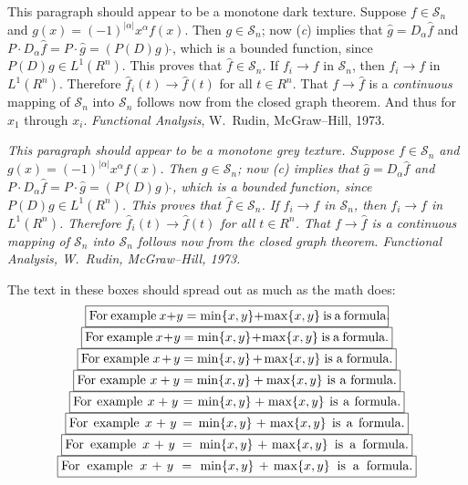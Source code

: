 \documentclass[fleqn]{article}
\newenvironment{boldface}{\bgroup\mathversion{bold}%
  \def\it{\fontseries{b}\fontshape{it}\selectfont}%
  \fontseries{b}\selectfont }{\egroup}
\begin{document}
\begin{boldface}
This paragraph should appear to be a monotone dark texture.  Suppose
\(f \in \mathcal{S}_n\) and \(g(x) = (-1)^{|\alpha|}x^\alpha
f(x)\).  Then \(g \in \mathcal{S}_n\); now (\emph{c}) implies
that \(\hat g = D_\alpha \hat f\) and \(P \cdot D_\alpha\hat
f = P \cdot \hat g = (P(D)g)\hat{}\), which is a bounded function,
since \(P(D)g \in L^1(R^n)\).  This proves that \(\hat f \in
\mathcal S_n\).  If \(f_i \rightarrow f\) in \(\mathcal S_n\),
then \(f_i \rightarrow f\) in \(L^1(R^n)\).  Therefore \(\hat
f_i(t) \rightarrow \hat f(t)\) for all \(t \in R^n\).  That \(f
\rightarrow \hat f\) is a \emph{continuous} mapping of
\(\mathcal S_n\) into \(\mathcal S_n\) follows now from the
closed graph theorem.  And thus for \(x_1\) through \(x_i\).
\emph{Functional Analysis}, W.~Rudin, McGraw--Hill, 1973.
\end{boldface}

{\itshape This paragraph should appear to be a monotone grey texture.
Suppose \(f \in \mathcal{S}_n\) and \(g(x) =
(-1)^{|\alpha|}x^\alpha f(x)\).  Then \(g \in \mathcal{S}_n\);
now (\emph{c}) implies that \(\hat g = D_\alpha \hat f\) and
\(P \cdot D_\alpha\hat f = P \cdot \hat g = (P(D)g)\hat{}\),
which is a bounded function, since \(P(D)g \in L^1(R^n)\).  This
proves that \(\hat f \in \mathcal S_n\).  If \(f_i \rightarrow
f\) in \(\mathcal S_n\), then \(f_i \rightarrow f\) in
\(L^1(R^n)\).  Therefore \(\hat f_i(t) \rightarrow \hat f(t)\)
for all \(t \in R^n\).  That \(f \rightarrow \hat f\) is a
\emph{continuous} mapping of \(\mathcal S_n\) into \(\mathcal
S_n\) follows now from the closed graph theorem.  \emph{Functional
Analysis}, W.~Rudin, McGraw--Hill, 1973.}

The text in these boxes should spread out as much as the math does:
$$\begin{array}{c}
   \framebox[.95\width][s]{For example \(x+y = \min\{x,y\}
      + \max\{x,y\}\) is a formula.} \\
   \framebox[.975\width][s]{For example \(x+y = \min\{x,y\}
      + \max\{x,y\}\) is a formula.} \\
   \framebox[\width][s]{For example \(x+y = \min\{x,y\}
      + \max\{x,y\}\) is a formula.} \\
   \framebox[1.025\width][s]{For example \(x+y = \min\{x,y\}
      + \max\{x,y\}\) is a formula.} \\
   \framebox[1.05\width][s]{For example \(x+y = \min\{x,y\}
      + \max\{x,y\}\) is a formula.} \\
   \framebox[1.075\width][s]{For example \(x+y = \min\{x,y\}
      + \max\{x,y\}\) is a formula.} \\
   \framebox[1.1\width][s]{For example \(x+y = \min\{x,y\}
      + \max\{x,y\}\) is a formula.} \\
   \framebox[1.125\width][s]{For example \(x+y = \min\{x,y\}
      + \max\{x,y\}\) is a formula.} \\
\end{array}$$
\end{document}
